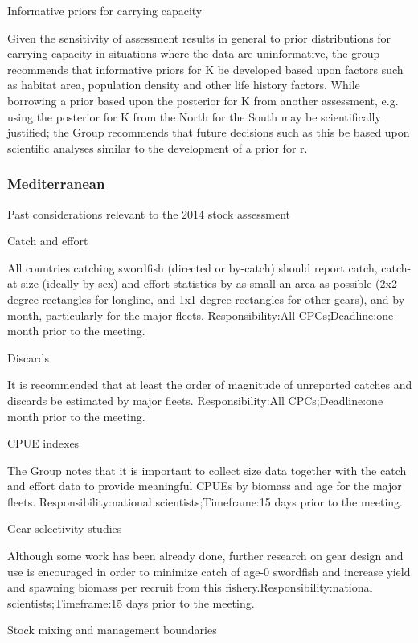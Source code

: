 \documentclass[a4paper,10pt]{article}
\begin{document}
Informative priors for carrying capacity

Given the sensitivity of assessment results in general to prior distributions for carrying capacity in situations where the data are uninformative, the group recommends that informative priors for K be developed based upon factors such as habitat area, population density and other life history factors. While borrowing a prior based upon the posterior for K from another assessment, e.g. using the posterior for K from the North for the South may be scientifically justified; the Group recommends that future decisions such as this be based upon scientific analyses similar to the development of a prior for r.

\subsubsection{Mediterranean}

Past considerations relevant to the 2014 stock assessment

Catch and effort

All countries catching swordfish (directed or by-catch) should report catch, catch-at-size (ideally by sex) and effort statistics by as small an area as possible (2x2 degree rectangles for longline, and 1x1  degree rectangles for other gears), and by month, particularly for the major fleets.
Responsibility:All CPCs;Deadline:one month prior to the meeting.


Discards

It is recommended that at least the order of magnitude of unreported catches and discards be estimated by major fleets.
Responsibility:All CPCs;Deadline:one month prior to the meeting.

CPUE indexes

The Group notes that it is important to collect size data together with the catch and effort data to provide meaningful CPUEs by biomass and age for the major fleets.
Responsibility:national scientists;Timeframe:15 days prior to the meeting.

Gear selectivity studies

Although some work has been already done, further research on gear design and use is encouraged in order to minimize catch of age-0 swordfish and increase yield and spawning biomass per recruit from this fishery.Responsibility:national scientists;Timeframe:15 days prior to the meeting.

Stock mixing and management boundaries
\end{document}
